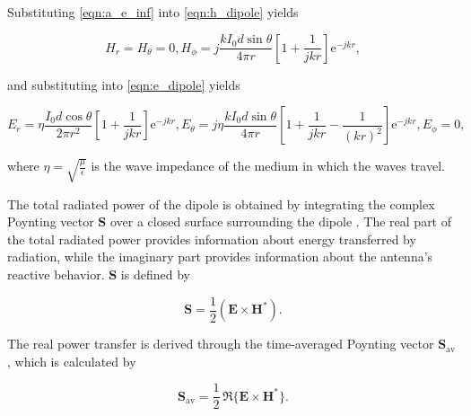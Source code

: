 Substituting \eqref{eqn:a_e_inf} into \eqref{eqn:h_dipole} yields

\begin{subequations}\label{eqn:e_h}
	\begin{equation}
		H_r=H_\theta=0,
		\label{eqn:e_hr}
	\end{equation}
	\begin{equation}
		H_\phi = j\frac{k I_0 d \sin\theta}{4\pi r}\left[1 + \frac{1}{jkr}\right]\mathrm{e}^{-jkr},
		\label{eqn:e_hpt}
	\end{equation}
\end{subequations}

and substituting into \cref{eqn:e_dipole} yields

\begin{subequations}\label{eqn:e_e}
	\begin{equation}
		E_r = \eta \frac{I_0 d \cos \theta}{2\pi r^2}\left[ 1 + \frac{1}{jkr} \right] \mathrm{e}^{-jkr},
		\label{eqn:e_er}
	\end{equation}
	\begin{equation}
		E_\theta = j\eta \frac{kI_0 d \sin \theta }{4\pi r}\left[ 1 + \frac{1}{jkr} - \frac{1}{(kr)^2} \right] \mathrm{e}^{-jkr},
		\label{eqn:e_et}
	\end{equation}
	\begin{equation}
		E_\phi = 0,
		\label{eqn:e_ep}
	\end{equation}
\end{subequations}

where $\eta=\sqrt{\frac{\mu}{\epsilon}}$ is the wave impedance of the medium in which the waves travel.

The total radiated power of the dipole is obtained by integrating the complex Poynting vector $\mathbf{S}$ over a closed surface surrounding the dipole \cite[p.~154]{Balanis_1997}. The real part of the total radiated power provides information about energy transferred by radiation, while the imaginary part provides information about the antenna's reactive behavior. $\mathbf{S}$ is defined by 

\begin{equation}
	\mathbf{S}=\frac{1}{2}\left(\mathbf{E}\times\mathbf{H}^*\right) .
	\label{eqn:com_pow_dens}
\end{equation}

The real power transfer is derived through the time-averaged Poynting vector $\mathbf{S}_\mathrm{av}$ \cite[p. 160]{Balanis_1997}, which is calculated by

\begin{equation}
	\mathbf{S}_\mathrm{av} = \frac{1}{2} \, \Re \{ \mathbf{E} \times \mathbf{H}^* \}.
	\label{eqn:time_averaged_poynting}
\end{equation}

